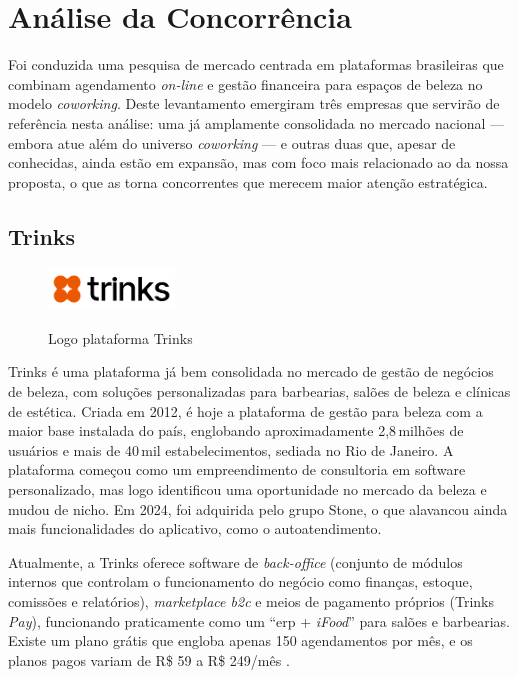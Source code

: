 \section{Análise da Concorrência}
\label{sec:analise-concorrencia}
Foi conduzida uma pesquisa de mercado centrada em plataformas brasileiras que combinam agendamento \emph{on-line} e gestão financeira para espaços de beleza no modelo \emph{coworking}. Deste levantamento emergiram três empresas que servirão de referência nesta análise: uma já amplamente consolidada no mercado nacional — embora atue além do universo \emph{coworking} — e outras duas que, apesar de conhecidas, ainda estão em expansão, mas com foco mais relacionado ao da nossa proposta, o que as torna concorrentes que merecem maior atenção estratégica.

\subsection{Trinks}

\begin{figure}[htb]
	\centering
	\caption{Logo plataforma Trinks}
	\includegraphics[width=0.3\textwidth]{cap01-Introducao/Images/1.4.1_Trinks}
	\label{fig:Trinks}
\end{figure}

 \FloatBarrier

Trinks é uma plataforma já bem consolidada no mercado de gestão de negócios de beleza, com soluções personalizadas para barbearias, salões de beleza e clínicas de estética. Criada em 2012, é hoje a plataforma de gestão para beleza com a maior base instalada do país, englobando aproximadamente 2,8\,milhões de usuários e mais de 40\,mil estabelecimentos, sediada no Rio de Janeiro. A plataforma começou como um empreendimento de consultoria em software personalizado, mas logo identificou uma oportunidade no mercado da beleza e mudou de nicho. Em 2024, foi adquirida pelo grupo Stone, o que alavancou ainda mais funcionalidades do aplicativo, como o autoatendimento.

Atualmente, a Trinks oferece software de \emph{back-office} (conjunto de módulos internos que controlam o funcionamento do negócio como finanças, estoque, comissões e relatórios), \emph{marketplace \gls{b2c}} e meios de pagamento próprios (Trinks \emph{Pay}), funcionando praticamente como um “\gls{erp} + \emph{iFood}” para salões e barbearias. Existe um plano grátis que engloba apenas 150 agendamentos por mês, e os planos pagos variam de R\$ 59 a R\$ 249/mês \cite{Trinks}.

